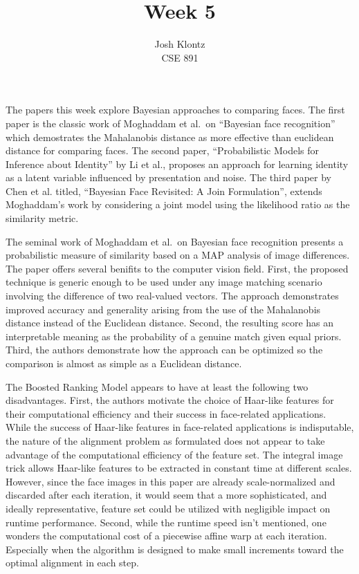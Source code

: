 \documentclass[12pt]{article}
\begin{document}
 
\title{Week 5}
\author{Josh Klontz\\CSE 891}
 
\maketitle
 
The papers this week explore Bayesian approaches to comparing faces.
The first paper is the classic work of Moghaddam et al.\ on ``Bayesian face recognition'' which demostrates the Mahalanobis distance as more effective than euclidean distance for comparing faces.
The second paper, ``Probabilistic Models for Inference about Identity'' by Li et al., proposes an approach for learning identity as a latent variable influenced by presentation and noise.
The third paper by Chen et al. titled, ``Bayesian Face Revisited: A Join Formulation'', extends Moghaddam's work by considering a joint model using the likelihood ratio as the similarity metric.
\par
The seminal work of Moghaddam et al.\ on Bayesian face recognition presents a probabilistic measure of similarity based on a MAP analysis of image differences.
The paper offers several benifits to the computer vision field.
First, the proposed technique is generic enough to be used under any image matching scenario involving the difference of two real-valued vectors.
The approach demonstrates improved accuracy and generality arising from the use of the Mahalanobis distance instead of the Euclidean distance.
Second, the resulting score has an interpretable meaning as the probability of a genuine match given equal priors.
Third, the authors demonstrate how the approach can be optimized so the comparison is almost as simple as a Euclidean distance.
\par
The Boosted Ranking Model appears to have at least the following two disadvantages. First, the authors motivate the choice of Haar-like features for their computational efficiency and their success in face-related applications. While the success of Haar-like features in face-related applications is indisputable, the nature of the alignment problem as formulated does not appear to take advantage of the computational efficiency of the feature set. The integral image trick allows Haar-like features to be extracted in constant time at different scales. However, since the face images in this paper are already scale-normalized and discarded after each iteration, it would seem that a more sophisticated, and ideally representative, feature set could be utilized with negligible impact on runtime performance. Second, while the runtime speed isn't mentioned, one wonders the computational cost of a piecewise affine warp at each iteration. Especially when the algorithm is designed to make small increments toward the optimal alignment in each step.
\end{document}
